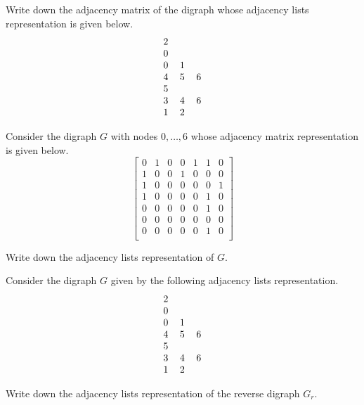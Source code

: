 \begin{Exercise}
\label{ex:list2matrix}

Write down the adjacency matrix of the digraph whose adjacency lists
representation is given below.
\newline
$$
\begin{tabular}{cccc}
2 &  & \\
0 & &\\
0 & 1&\\
4 & 5 & 6\\
5 & &\\
3 & 4 & 6 \\
1 & 2 & \\
\end{tabular}
$$

\end{Exercise}

\begin{Exercise}[2003FT test]
\label{ex:matrix2list}

Consider the digraph $G$ with nodes $0, \dots ,6$ whose adjacency matrix
representation is given 
below. 
\newline
$$
\left[
\begin{matrix}
0 & 1 & 0 & 0 & 1 & 1 & 0 \\
1 & 0 & 0 & 1 & 0 & 0 & 0 \\
1 & 0 & 0 & 0 & 0 & 0 & 1 \\
1 & 0 & 0 & 0 & 0 & 1 & 0 \\
0 & 0 & 0 & 0 & 0 & 1 & 0 \\
0 & 0 & 0 & 0 & 0 & 0 & 0 \\
0 & 0 & 0 & 0 & 0 & 1 & 0 \\
\end{matrix}
\right]
$$

Write down the adjacency lists representation of $G$.

\end{Exercise}

\begin{Exercise}[2003]
\label{ex:listreverse}

Consider the digraph $G$ given by the following adjacency lists
representation.
$$
\begin{tabular}{cccc}
2 &  & \\
0 & &\\
0 & 1&\\   
4 & 5 & 6\\
5 & &\\
3 & 4 & 6 \\
1 & 2 & \\
\end{tabular}
$$

Write down the adjacency lists representation of the reverse digraph
$G_r$.

\end{Exercise}

